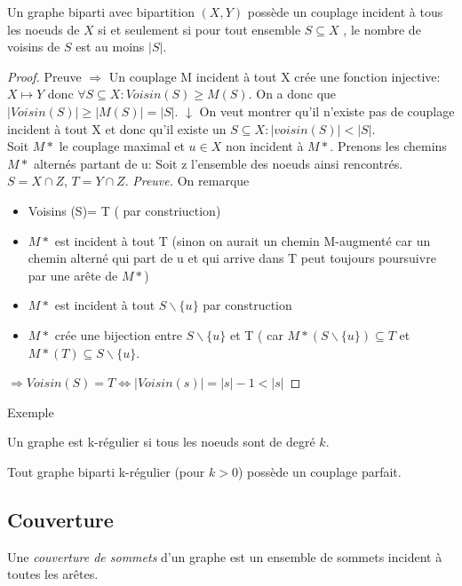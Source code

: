 \begin{mytheo} 
  Un graphe biparti avec bipartition $(X , Y)$ possède un couplage incident à tous les noeuds de $X$ si et seulement si pour tout ensemble $S \subseteq X$ , le nombre de voisins de $S$ est au moins $|S|$.
  \begin{proof}
     Preuve $\Longrightarrow$ Un couplage M incident à tout X crée une fonction injective: $X\mapsto Y$ donc $\forall S \subseteq X: Voisin (S) \geq M(S) $. On a donc que $ |Voisin (S)| \geq |M(S)| = |S| $.
     $\downarrow$ On veut montrer qu'il n'existe pas de couplage incident à tout X et donc qu'il existe un $ S \subseteq X: |voisin (S)| < |S|$. \\
     Soit $M*$ le couplage maximal et $ u \in X$ non incident à $M*$. Prenons les chemins $M*$ alternés partant de u: Soit z l'ensemble des noeuds ainsi rencontrés. $ S = X\cap Z$, $T= Y \cap Z$. 
     \textit{Preuve.} On remarque \begin{itemize}
     \item Voisins (S)= T ( par constriuction)
     \item	$M*$ est incident à tout T (sinon on aurait un chemin M-augmenté car un chemin alterné qui part de u et qui arrive dans T peut toujours poursuivre par une arête de $M*$)
     \item $M*$ est incident à tout $S\backslash\lbrace u\rbrace$ par construction
     \item $M*$ crée une bijection entre $S\backslash\lbrace u\rbrace$ et T ( car $M* (S\backslash\lbrace u\rbrace) \subseteq T$ et $M*(T) \subseteq S\backslash\lbrace u\rbrace$.
     \end{itemize}
     $ \Rightarrow  Voisin (S)= T \Longleftrightarrow  |Voisin(s)| = |s|-1 < |s|$ 
     
  \end{proof}
\end{mytheo}
\begin{myexem}
  Exemple \addTODO
\end{myexem}

\begin{myrem}
  Un graphe est k-régulier si tous les noeuds sont de degré $k$.
\end{myrem}

\begin{mycorr}
  Tout graphe biparti k-régulier (pour $k > 0$) possède un couplage parfait.
\end{mycorr}

\subsection{Couverture}
\begin{mydef}
  Une \emph{couverture de sommets} d’un graphe est un ensemble de sommets incident à toutes les arêtes.
\end{mydef}

